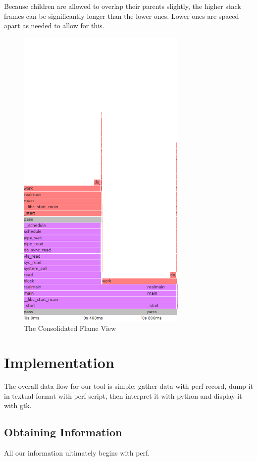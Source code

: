 \documentclass[10pt]{article}
\begin{document}
Because children are allowed to overlap their parents slightly, the higher stack frames can be significantly longer than the lower ones.  Lower ones are spaced apart as needed to allow for this.

\begin{figure}[h]
\includegraphics[width=3.25in]{passcons}
\caption{The Consolidated Flame View}
\end{figure}

\section{Implementation}

The overall data flow for our tool is simple: gather data with perf record, dump it in textual format with perf script, then interpret it with python and display it with gtk.

\subsection{Obtaining Information}

All our information ultimately begins with perf.
\end{document}
